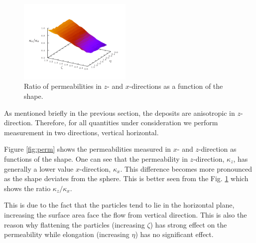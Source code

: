 \documentclass[aps,twocolumn,superscriptaddress,showpacs,showkeys]{revtex4}
\begin{document}
\begin{figure}
\begin{center}
\includegraphics*[width=0.48\textwidth,angle=0]{data-figs/permeability_ratio}
\caption{\protect
	Ratio of permeabilities in $z$- and $x$-directions as a function of the shape. 
	}
\label{fig:perm_ratio}
\end{center}
\end{figure}
As mentioned briefly in the previous section, the deposits are anisotropic in $z$-direction. 
Therefore, for all quantities under consideration we perform measurement in two directions, vertical 
horizontal. 

Figure \ref{fig:perm} shows the permeabilities measured in $x$- and $z$-direction as functions of the shape. 
One can see that the permeability in $z$-direction, $\kappa_z$, has generally a lower value $x$-direction, $\kappa_x$. This difference 
becomes more pronounced as the shape deviates from the sphere. This is better seen from the Fig. \ref{fig:perm_ratio} 
which shows the ratio $\kappa_z/\kappa_x$.

This is due to the fact that the particles tend to lie in the horizontal plane, 
increasing the surface area face the flow from vertical direction.
This is also the reason why flattening the particles (increasing $\zeta$) 
has strong effect on the permeability while elongation (increasing $\eta$) 
has no significant effect.
\end{document}
